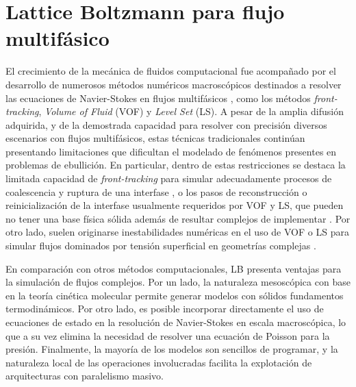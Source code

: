 \section{Lattice Boltzmann para flujo multif\'asico}
El crecimiento de la mec\'anica de fluidos computacional fue acompa\~nado por el desarrollo de numerosos m\'etodos num\'ericos macrosc\'opicos destinados a resolver las ecuaciones de Navier-Stokes en flujos multif\'asicos \cite{scardovelli_direct_1999}, como los m\'etodos \emph{front-tracking}, \emph{Volume of Fluid} (VOF) y \emph{Level Set} (LS). A pesar de la amplia difusi\'on adquirida, y de la demostrada capacidad para resolver con precisi\'on diversos escenarios con flujos multif\'asicos, estas t\'ecnicas tradicionales contin\'uan presentando limitaciones que dificultan el modelado de fen\'omenos presentes en problemas de ebullici\'on. En particular, dentro de estas restricciones se destaca la limitada capacidad de \emph{front-tracking} para simular adecuadamente procesos de coalescencia y ruptura de una interfase \cite{scardovelli_direct_1999,liu_three-dimensional_2012}, o los pasos de reconstrucci\'on o reinicializaci\'on de la interfase usualmente requeridos por VOF y LS, que pueden no tener una base f\'isica s\'olida adem\'as de resultar complejos de implementar \cite{liu_three-dimensional_2012}. Por otro lado, suelen originarse inestabilidades num\'ericas en el uso de VOF o LS para simular flujos dominados por tensi\'on superficial en geometr\'ias complejas \cite{scardovelli_direct_1999}.
\par
En comparaci\'on con otros m\'etodos computacionales, LB presenta ventajas para la simulaci\'on de flujos complejos. Por un lado, la naturaleza mesosc\'opica con base en la teor\'ia cin\'etica molecular permite generar modelos con s\'olidos fundamentos termodin\'amicos. Por otro lado, es posible incorporar directamente el uso de ecuaciones de estado en la resoluci\'on de Navier-Stokes en escala macrosc\'opica, lo que a su vez elimina la necesidad de resolver una ecuaci\'on de Poisson para la presi\'on. Finalmente, la mayor\'ia de los modelos son sencillos de programar, y la naturaleza local de las operaciones involucradas facilita la explotaci\'on de arquitecturas con paralelismo masivo.

